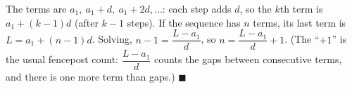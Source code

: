 The terms are $a_1,\ a_1+d,\ a_1+2d,\dots$: each step adds $d$, so the $k$th term is $a_1+(k-1)d$ (after $k-1$ steps). If the sequence has $n$ terms, its last term is $L=a_1+(n-1)d$. Solving, $n-1=\dfrac{L-a_1}{d}$, so $n=\dfrac{L-a_1}{d}+1$. (The ``$+1$'' is the usual fencepost count: $\dfrac{L-a_1}{d}$ counts the gaps between consecutive terms, and there is one more term than gaps.) $\blacksquare$
